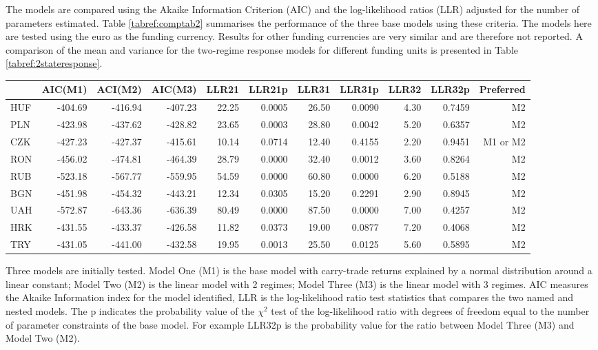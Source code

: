 \documentclass[12pt, a4paper, oneside]{article}\usepackage[]{graphicx}\usepackage[]{color}
\begin{document}
The models are compared using the Akaike Information Criterion (AIC) and the log-likelihood ratios (LLR) adjusted for the number of parameters estimated.  Table \ref{tabref:comptab2} summarises the performance of the three base models using these criteria. The models here are tested using the euro as the funding currency.  Results for other funding currencies are very similar and are therefore not reported.  A comparison of the mean and variance for the two-regime response models for different funding units is presented in Table \ref{tabref:2stateresponse}. 

\begin{sidewaystable}[p]
\begin{threeparttable}
\centering
\begin{tabular}{l|rrrrrrrrrr}
  \hline
 & AIC(M1) & ACI(M2) & AIC(M3) & LLR21 & LLR21p & LLR31 & LLR31p & LLR32 & LLR32p & Preferred\\ 
  \hline HUF & -404.69 & -416.94 & -407.23 & 22.25 & 0.0005 & 26.50 & 0.0090 & 4.30 & 0.7459 & M2\\  PLN & -423.98 & -437.62 & -428.82 & 23.65 & 0.0003 & 28.80 & 0.0042 & 5.20 & 0.6357 & M2\\  CZK & -427.23 & -427.37 & -415.61 & 10.14 & 0.0714 & 12.40 & 0.4155 & 2.20 & 0.9451 & M1 or M2\\  RON & -456.02 & -474.81 & -464.39 & 28.79 & 0.0000 & 32.40 & 0.0012 & 3.60 & 0.8264 & M2\\  RUB & -523.18 & -567.77 & -559.95 & 54.59 & 0.0000 & 60.80 & 0.0000 & 6.20 & 0.5188 & M2\\  BGN & -451.98 & -454.32 & -443.21 & 12.34 & 0.0305 & 15.20 & 0.2291 & 2.90 & 0.8945 & M2\\  UAH & -572.87 & -643.36 & -636.39 & 80.49 & 0.0000 & 87.50 & 0.0000 & 7.00 & 0.4257 & M2\\ 
  HRK & -431.55 & -433.37 & -426.58 & 11.82 & 0.0373 & 19.00 & 0.0877 & 7.20 & 0.4068 & M2\\ 
  TRY & -431.05 & -441.00 & -432.58 & 19.95 & 0.0013 & 25.50 & 0.0125 & 5.60 & 0.5895 & M2\\ 
   \hline
\end{tabular}
\begin{tablenotes}
\small
\item Three models are initially tested.  Model One (M1) is the base model with carry-trade returns explained by a normal distribution around a linear constant; Model Two (M2) is the linear model with 2 regimes; Model Three (M3) is the linear model with 3 regimes.  AIC measures the Akaike Information index for the model identified, LLR is the log-likelihood ratio test statistics that compares the two named and nested models.  The p indicates the probability value of the $\chi^2$ test of the log-likelihood ratio with degrees of freedom equal to the number of parameter constraints of the base model.  For example LLR32p is the probability value for the ratio between Model Three (M3) and Model Two (M2).

\end{tablenotes}
\end{threeparttable}
\end{sidewaystable}
\end{document}
